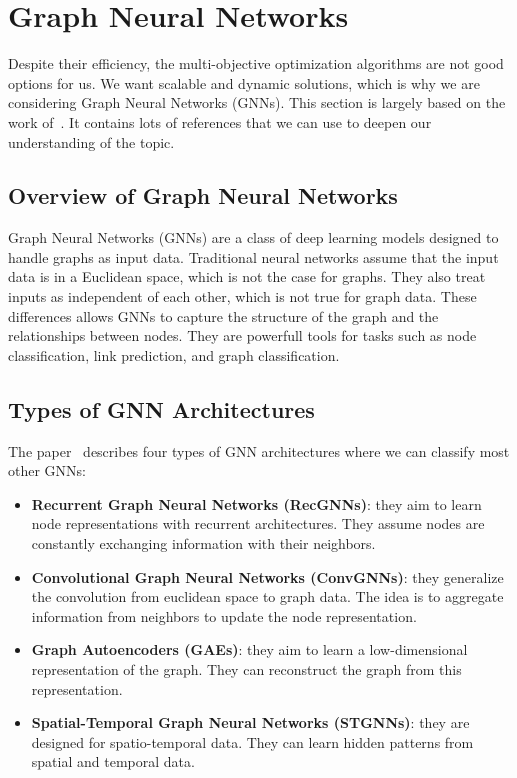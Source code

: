 \documentclass[10pt]{article}
\begin{document}
    \section{Graph Neural Networks}\label{sec:graph-neural-networks}
    Despite their efficiency, the multi-objective optimization algorithms are not good options for us.
    We want scalable and dynamic solutions, which is why we are considering Graph Neural Networks (GNNs).
    This section is largely based on the work of~\cite{ref1}.
    It contains lots of references that we can use to deepen our understanding of the topic.

    \subsection{Overview of Graph Neural Networks}\label{subsec:overview-of-graph-neural-networks}
    Graph Neural Networks (GNNs) are a class of deep learning models designed to handle graphs as input data.
    Traditional neural networks assume that the input data is in a Euclidean space, which is not the case for graphs.
    They also treat inputs as independent of each other, which is not true for graph data.
    These differences allows GNNs to capture the structure of the graph and the relationships between nodes.
    They are powerfull tools for tasks such as node classification, link prediction, and graph classification.

    \subsection{Types of GNN Architectures}\label{subsec:types-of-gnn-architectures}
    The paper~\cite{ref1} describes four types of GNN architectures where we can classify most other GNNs:

    \begin{itemize}
        \item \textbf{Recurrent Graph Neural Networks (RecGNNs)}: they aim to learn node representations with recurrent architectures.
        They assume nodes are constantly exchanging information with their neighbors.
        \item \textbf{Convolutional Graph Neural Networks (ConvGNNs)}: they generalize the convolution from euclidean space to graph data.
        The idea is to aggregate information from neighbors to update the node representation.
        \item \textbf{Graph Autoencoders (GAEs)}: they aim to learn a low-dimensional representation of the graph.
        They can reconstruct the graph from this representation.
        \item \textbf{Spatial-Temporal Graph Neural Networks (STGNNs)}: they are designed for spatio-temporal data.
        They can learn hidden patterns from spatial and temporal data.
    \end{itemize}
\end{document}
